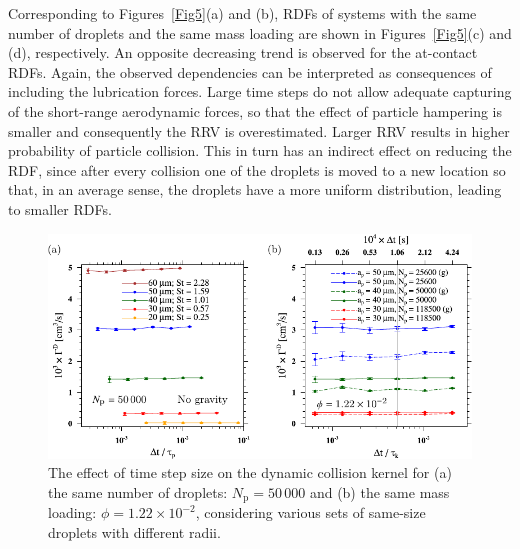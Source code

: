 \documentclass[../thesis.tex]{subfiles}
\begin{document}
Corresponding to Figures~\ref{Fig5}(a) and (b), RDFs of systems with the same number of droplets and the same mass loading are shown in Figures~\ref{Fig5}(c) and (d), respectively. An opposite decreasing trend is observed for the at-contact RDFs. Again, the observed dependencies can be interpreted as consequences of including the lubrication forces. Large time steps do not allow adequate capturing of the short-range aerodynamic forces, so that the effect of particle hampering is smaller and consequently the RRV is overestimated. Larger RRV results in higher probability of particle collision. This in turn has an indirect effect on reducing the RDF, since after every collision one of the droplets is moved to a new location so that, in an average sense, the droplets have a more uniform distribution, leading to smaller RDFs. 

\begin{figure}%
\center
\includegraphics[width=\textwidth]{../figs/JFM/fig6.pdf}
\caption{The effect of time step size on the dynamic collision kernel for (a) the same number of droplets: $N_\mathrm{p} = 50\,000$ and (b) the same mass loading: $\phi = 1.22\times10^{-2}$, considering various sets of same-size droplets with different radii.}
\label{Fig6}
\end{figure}%
\end{document}
